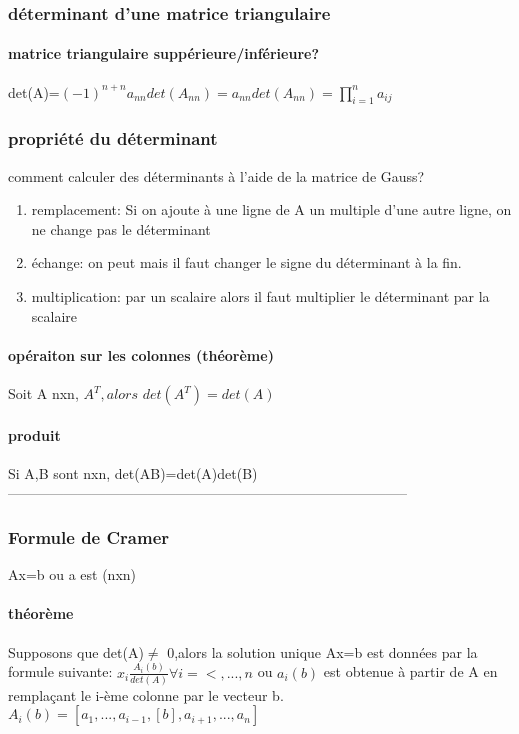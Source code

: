 \documentclass[a4paper,10pt]{article}
\begin{document}
\subsubsection{déterminant d'une matrice triangulaire}
\paragraph{matrice triangulaire suppérieure/inférieure?}
det(A)=$(-1)^{n+n}a_{nn}det(A_{nn})=a_{nn}det(A_{nn})=\prod_{i=1}^na_{ij}$
\subsubsection{propriété du déterminant}
comment calculer des déterminants à l'aide de la matrice de Gauss?
\begin{enumerate}
 \item remplacement: Si on ajoute à une ligne de A un multiple d'une autre ligne, on ne change pas le déterminant
 \item échange: on peut mais il faut changer le signe du déterminant à la fin.
 \item multiplication:  par un scalaire alors il faut multiplier le déterminant par la scalaire
\end{enumerate}

\paragraph{opéraiton sur les colonnes (théorème)}
Soit A nxn, $A^T,alors$ $det(A^T) = det(A)$

\paragraph{produit}
Si A,B sont nxn, det(AB)=det(A)det(B)
\newline
--------------------------------------------------------------------------------------
\subsubsection{Formule de Cramer}
Ax=b ou a est (nxn)
\paragraph{théorème}
Supposons que det(A)$\neq$ 0,alors la solution unique Ax=b est données par la formule suivante:
\newline
$x_i\frac{A_i(b)}{det(A)}\forall i=<,...,n$ ou $a_i(b)$ est obtenue à partir de A en remplaçant le i-ème colonne par le vecteur b.
\newline
$A_i(b)=[a_1,...,a_{i-1},[b],a_{i+1},...,a_n]$ 
\end{document}
